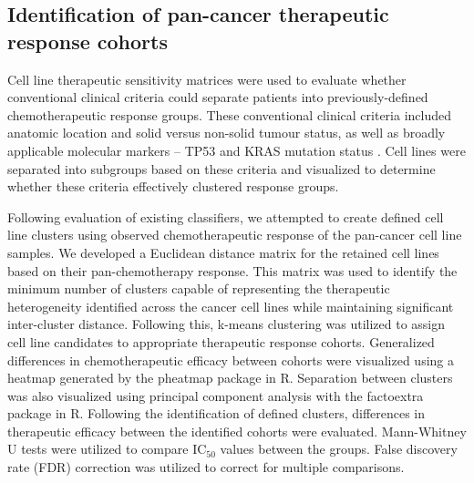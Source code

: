 \documentclass[10pt, letterpaper, twocolumn]{article}
\begin{document}
\subsection{Identification of pan-cancer therapeutic response cohorts}
Cell line therapeutic sensitivity matrices were used to evaluate whether conventional clinical criteria could separate patients into previously-defined chemotherapeutic response groups. These conventional clinical criteria included anatomic location and solid versus non-solid tumour status, as well as broadly applicable molecular markers -- TP53 and KRAS mutation status \cite{colorectal, gi, lung, breast}. Cell lines were separated into subgroups based on these criteria and visualized to determine whether these criteria effectively clustered response groups.

Following evaluation of existing classifiers, we attempted to create defined cell line clusters using observed chemotherapeutic response of the pan-cancer cell line samples. We developed a Euclidean distance matrix for the retained cell lines based on their pan-chemotherapy response. This matrix was used to identify the minimum number of clusters capable of representing the therapeutic heterogeneity identified across the cancer cell lines while maintaining significant inter-cluster distance. Following this, k-means clustering was utilized to assign cell line candidates to appropriate therapeutic response cohorts. Generalized differences in chemotherapeutic efficacy between cohorts were visualized using a heatmap generated by the pheatmap package \cite{pheatmap} in R. Separation between clusters was also visualized using principal component analysis with the factoextra package \cite{factoextra} in R. Following the identification of defined clusters, differences in therapeutic efficacy between the identified cohorts were evaluated. Mann-Whitney U tests were utilized to compare IC$_{50}$ values between the groups. False discovery rate (FDR) correction was utilized to correct for multiple comparisons.
\end{document}
